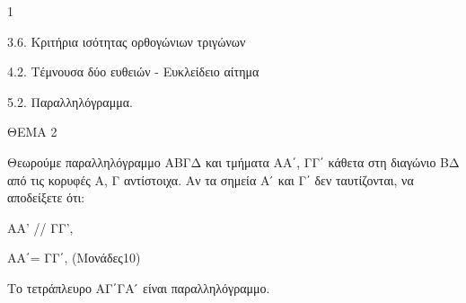 \begin{ylh}{1}
    \item 3.6. Κριτήρια ισότητας ορθογώνιων τριγώνων
    \item 4.2. Τέμνουσα δύο ευθειών - Ευκλείδειο αίτημα
    \item 5.2. Παραλληλόγραμμα.
\end{ylh}

ΘΕΜΑ 2

Θεωρούμε παραλληλόγραμμο ΑΒΓΔ και τμήματα ΑΑ΄, ΓΓ΄ κάθετα στη διαγώνιο ΒΔ από τις κορυφές Α, Γ αντίστοιχα. Αν τα σημεία Α ́ και Γ΄ δεν ταυτίζονται, να αποδείξετε ότι:

\begin{alist}
\item ΑΑ' // ΓΓ', 

\item ΑΑ΄= ΓΓ΄, (Μονάδες10)

\item Το τετράπλευρο ΑΓ΄ΓΑ ́ είναι παραλληλόγραμμο. 


\begin{center}
\end{center}
\end{alist}
